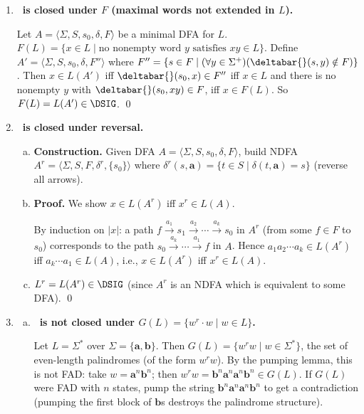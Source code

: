 \begin{enumerate}[{5.}1. ]
\item \textbf{\DSIG\ is closed under $F$ (maximal words not extended in $L$).}

Let $A=\langle\Sigma,S,s_0,\delta,F\rangle$ be a minimal DFA for $L$.
$F(L)=\{x\in L\mid \text{no nonempty word }y\text{ satisfies }xy\in L\}$.
Define $A'=\langle\Sigma,S,s_0,\delta,F''\rangle$ where
$F''=\{s\in F\mid(\forall y\in\Sigma^+)(\deltabar{}(s,y)\notin F)\}$.
Then $x\in L(A')$ iff $\deltabar{}(s_0,x)\in F''$ iff $x\in L$ and there is no
nonempty $y$ with $\deltabar{}(s_0,xy)\in F$, iff $x\in F(L)$.
So $F(L)=L(A')\in\DSIG$. \qed

\item \textbf{\DSIG\ is closed under reversal.}

\begin{enumerate}[(a)]
  \item \textbf{Construction.}  Given DFA $A=\langle\Sigma,S,s_0,\delta,F\rangle$,
  build NDFA $A^r=\langle\Sigma,S,F,\delta^r,\{s_0\}\rangle$ where
  $\delta^r(s,\pmb{a})=\{t\in S\mid\delta(t,\pmb{a})=s\}$ (reverse all arrows).

  \item \textbf{Proof.}  We show $x\in L(A^r)$ iff $x^r\in L(A)$.

  By induction on $|x|$: a path $f\xrightarrow{a_1}s_1\xrightarrow{a_2}\cdots\xrightarrow{a_k}s_0$ in $A^r$ (from some $f\in F$ to $s_0$) corresponds to the path $s_0\xrightarrow{a_k}\cdots\xrightarrow{a_1}f$ in $A$.  Hence $a_1a_2\cdots a_k\in L(A^r)$ iff $a_k\cdots a_1\in L(A)$, i.e., $x\in L(A^r)$ iff $x^r\in L(A)$.

  \item $L^r=L(A^r)\in\DSIG$ (since $A^r$ is an NDFA which is equivalent to some DFA). \qed
\end{enumerate}

\item \begin{enumerate}[(a)]
  \item \textbf{\DSIG\ is not closed under $G(L)=\{w^r\cdot w\mid w\in L\}$.}

  Let $L=\Sigma^*$ over $\Sigma=\{\pmb{a},\pmb{b}\}$.  Then $G(L)=\{w^rw\mid w\in\Sigma^*\}$, the set of even-length palindromes (of the form $w^rw$).  By the pumping lemma, this is not FAD: take $w=\pmb{a}^n\pmb{b}^n$; then $w^rw=\pmb{b}^n\pmb{a}^n\pmb{a}^n\pmb{b}^n\in G(L)$.  If $G(L)$ were FAD with $n$ states, pump the string $\pmb{b}^n\pmb{a}^n\pmb{a}^n\pmb{b}^n$ to get a contradiction (pumping the first block of $\pmb{b}$s destroys the palindrome structure).


\end{enumerate}
\end{enumerate}

